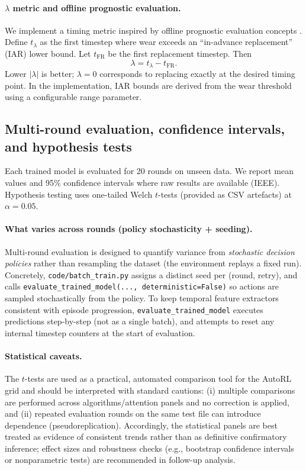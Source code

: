 \documentclass[11pt]{article}
\begin{document}
\paragraph{$\lambda$ metric and offline prognostic evaluation.}
We implement a timing metric inspired by offline prognostic evaluation concepts \parencite{Saxena2008Metrics}. Define $t_{\lambda}$ as the first timestep where wear exceeds an ``in-advance replacement'' (IAR) lower bound. Let $t_{\mathrm{FR}}$ be the first replacement timestep. Then
\begin{equation}
	\lambda = t_{\lambda} - t_{\mathrm{FR}}.
\end{equation}
Lower $|\lambda|$ is better; $\lambda=0$ corresponds to replacing exactly at the desired timing point. In the implementation, IAR bounds are derived from the wear threshold using a configurable range parameter.

\subsection{Multi-round evaluation, confidence intervals, and hypothesis tests}
Each trained model is evaluated for 20 rounds on unseen data. We report mean values and 95\% confidence intervals where raw results are available (IEEE). Hypothesis testing uses one-tailed Welch $t$-tests (provided as CSV artefacts) at $\alpha=0.05$.

\paragraph{What varies across rounds (policy stochasticity + seeding).}
Multi-round evaluation is designed to quantify variance from \emph{stochastic decision policies} rather than resampling the dataset (the environment replays a fixed run). Concretely, \texttt{code/batch\_train.py} assigns a distinct seed per (round, retry), and calls \texttt{evaluate\_trained\_model(..., deterministic=False)} so actions are sampled stochastically from the policy. To keep temporal feature extractors consistent with episode progression, \texttt{evaluate\_trained\_model} executes predictions step-by-step (not as a single batch), and attempts to reset any internal timestep counters at the start of evaluation.

\paragraph{Statistical caveats.}
The $t$-tests are used as a practical, automated comparison tool for the AutoRL grid and should be interpreted with standard cautions: (i) multiple comparisons are performed across algorithms/attention panels and no correction is applied, and (ii) repeated evaluation rounds on the same test file can introduce dependence (pseudoreplication). Accordingly, the statistical panels are best treated as evidence of consistent trends rather than as definitive confirmatory inference; effect sizes and robustness checks (e.g., bootstrap confidence intervals or nonparametric tests) are recommended in follow-up analysis.
\end{document}
